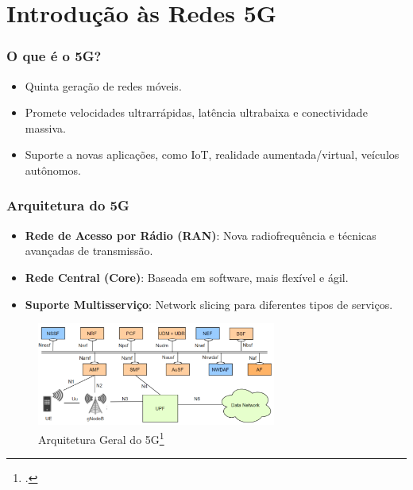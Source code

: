
\section{Introdução às Redes 5G}
\begin{frame}
    \frametitle{O que é o 5G?}
    \begin{itemize}
        \item Quinta geração de redes móveis.
        \item Promete velocidades ultrarrápidas, latência ultrabaixa e conectividade massiva.
        \item Suporte a novas aplicações, como IoT, realidade aumentada/virtual, veículos autônomos.
    \end{itemize}
\end{frame}

\begin{frame}
    \frametitle{Arquitetura do 5G}
    \begin{itemize}
        \item \textbf{Rede de Acesso por Rádio (RAN)}: Nova radiofrequência e técnicas avançadas de transmissão.
        \item \textbf{Rede Central (Core)}: Baseada em software, mais flexível e ágil.
        \item \textbf{Suporte Multisserviço}: Network slicing para diferentes tipos de serviços.
    \end{itemize}
    \begin{figure}
        \centering
        \includegraphics[width=0.7\textwidth]{figs/ArquiteturaGeral5G}
        \caption{Arquitetura Geral do 5G\footcite{5G_architecture}}
    \end{figure}
\end{frame}

